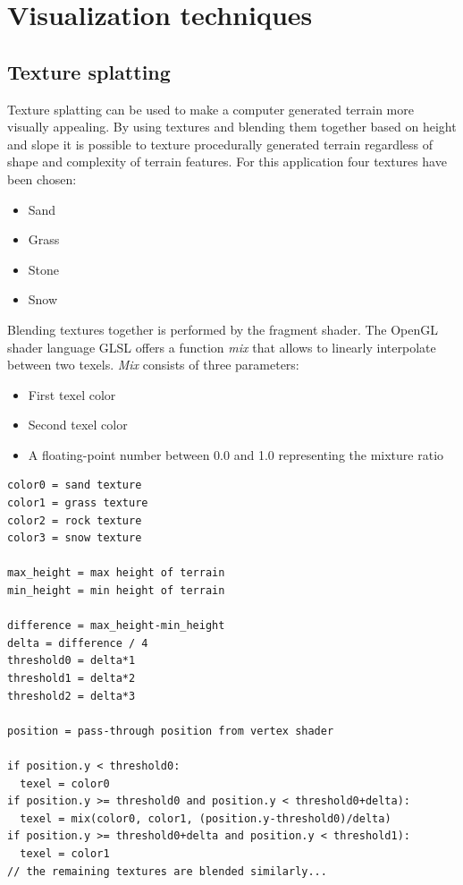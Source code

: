 \documentclass[11pt,a4paper,twoside,openright]{report}
\begin{document}
\section{Visualization techniques}
\subsection{Texture splatting}
Texture splatting can be used to make a computer generated terrain more visually appealing. By using textures and blending them together based on height and slope it is possible to texture procedurally generated terrain regardless of shape and complexity of terrain features. For this application four textures have been chosen:
\begin{itemize}
\item Sand
\item Grass
\item Stone
\item Snow
\end{itemize}
Blending textures together is performed by the fragment shader. The OpenGL shader language GLSL offers a function \emph{mix} that allows to linearly interpolate between two texels. \emph{Mix} consists of three parameters:
\begin{itemize}
\item First texel color
\item Second texel color
\item A floating-point number between 0.0 and 1.0 representing the mixture ratio
\end{itemize}
\begin{lstlisting}[caption=Fragment shader texture chooser pseudocode]
color0 = sand texture
color1 = grass texture
color2 = rock texture
color3 = snow texture

max_height = max height of terrain
min_height = min height of terrain

difference = max_height-min_height
delta = difference / 4
threshold0 = delta*1
threshold1 = delta*2
threshold2 = delta*3

position = pass-through position from vertex shader

if position.y < threshold0:
  texel = color0
if position.y >= threshold0 and position.y < threshold0+delta):
  texel = mix(color0, color1, (position.y-threshold0)/delta)
if position.y >= threshold0+delta and position.y < threshold1):
  texel = color1
// the remaining textures are blended similarly...
\end{lstlisting}
\end{document}
